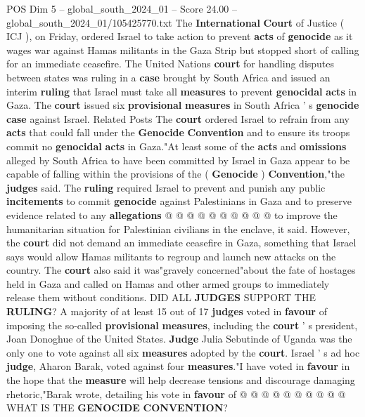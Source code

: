 \begin{textsample}{POS Dim 5 – global\_south\_2024\_01 – Score 24.00 – global\_south\_2024\_01/105425770.txt}  \label{ex:f5_pos_003}
The \textbf{International} \textbf{Court} of Justice ( ICJ ), on Friday, ordered Israel to take action to prevent \textbf{acts} of \textbf{genocide} as it wages war against Hamas militants in the Gaza Strip but stopped short of calling for an immediate ceasefire.
The United Nations \textbf{court} for handling disputes between states was ruling in a \textbf{case} brought by South Africa and issued an interim \textbf{ruling} that Israel must take all \textbf{measures} to prevent \textbf{genocidal} \textbf{acts} in Gaza.
The \textbf{court} issued six \textbf{provisional} \textbf{measures} in South Africa ' s \textbf{genocide} \textbf{case} against Israel.
Related Posts The \textbf{court} ordered Israel to refrain from any \textbf{acts} that could fall under the \textbf{Genocide} \textbf{Convention} and to ensure its troops commit no \textbf{genocidal} \textbf{acts} in Gaza."At least some of the \textbf{acts} and \textbf{omissions} alleged by South Africa to have been committed by Israel in Gaza appear to be capable of falling within the provisions of the ( \textbf{Genocide} ) \textbf{Convention},"the \textbf{judges} said.
The \textbf{ruling} required Israel to prevent and punish any public \textbf{incitements} to commit \textbf{genocide} against Palestinians in Gaza and to preserve evidence related to any \textbf{allegations} @ @ @ @ @ @ @ @ @ @ to improve the humanitarian situation for Palestinian civilians in the enclave, it said.
However, the \textbf{court} did not demand an immediate ceasefire in Gaza, something that Israel says would allow Hamas militants to regroup and launch new attacks on the country.
The \textbf{court} also said it was"gravely concerned"about the fate of hostages held in Gaza and called on Hamas and other armed groups to immediately release them without conditions.
DID ALL \textbf{JUDGES} SUPPORT THE \textbf{RULING}?
A majority of at least 15 out of 17 \textbf{judges} voted in \textbf{favour} of imposing the so-called \textbf{provisional} \textbf{measures}, including the \textbf{court} ' s president, Joan Donoghue of the United States. \textbf{Judge} Julia Sebutinde of Uganda was the only one to vote against all six \textbf{measures} adopted by the \textbf{court}.
Israel ' s ad hoc \textbf{judge}, Aharon Barak, voted against four \textbf{measures}."I have voted in \textbf{favour} in the hope that the \textbf{measure} will help decrease tensions and discourage damaging rhetoric,"Barak wrote, detailing his vote in \textbf{favour} of @ @ @ @ @ @ @ @ @ @ WHAT IS THE \textbf{GENOCIDE} \textbf{CONVENTION}?

\end{textsample}
